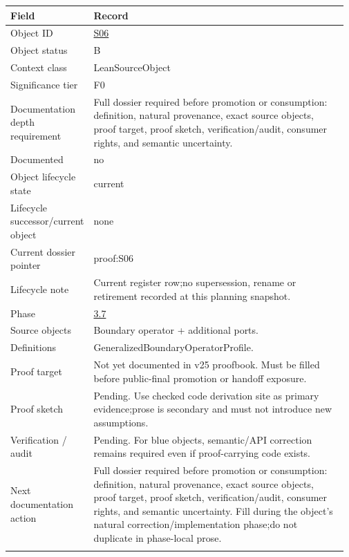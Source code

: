 \begin{longtable}{L{0.16\linewidth} L{0.81\linewidth}}
\hline
\textbf{Field} & \textbf{Record}\\
\hline
Object ID & \hyperlink{object-row-S06}{S06}\\
\hline\addlinespace[0.20em]
Object status & B\\
\hline\addlinespace[0.20em]
Context class & LeanSourceObject\\
\hline\addlinespace[0.20em]
Significance tier & F0\\
\hline\addlinespace[0.20em]
Documentation depth requirement & Full dossier required before promotion or consumption: definition, natural provenance, exact source objects, proof target, proof sketch, verification/\allowbreak{}audit, consumer rights, and semantic uncertainty.\\
\hline\addlinespace[0.20em]
Documented & no\\
\hline\addlinespace[0.20em]
Object lifecycle state & current\\
\hline\addlinespace[0.20em]
Lifecycle successor/\allowbreak{}current object & none\\
\hline\addlinespace[0.20em]
Current dossier pointer & proof:S06\\
\hline\addlinespace[0.20em]
Lifecycle note & Current register row;\newline no supersession, rename or retirement recorded at this planning snapshot.\\
\hline\addlinespace[0.20em]
Phase & \hyperlink{phase-row-3-7}{3.7}\\
\hline\addlinespace[0.20em]
Source objects & Boundary operator + additional ports.\\
\hline\addlinespace[0.20em]
Definitions & GeneralizedBoundaryOperatorProfile.\\
\hline\addlinespace[0.20em]
Proof target & Not yet documented in v25 proofbook. Must be filled before public-final promotion or handoff exposure.\\
\hline\addlinespace[0.20em]
Proof sketch & Pending. Use checked code derivation site as primary evidence;\newline prose is secondary and must not introduce new assumptions.\\
\hline\addlinespace[0.20em]
Verification /\allowbreak{} audit & Pending. For blue objects, semantic/\allowbreak{}API correction remains required even if proof-carrying code exists.\\
\hline\addlinespace[0.20em]
Next documentation action & Full dossier required before promotion or consumption: definition, natural provenance, exact source objects, proof target, proof sketch, verification/\allowbreak{}audit, consumer rights, and semantic uncertainty. Fill during the object's natural correction/\allowbreak{}implementation phase;\newline do not duplicate in phase-local prose.\\
\hline\addlinespace[0.20em]
\end{longtable}
